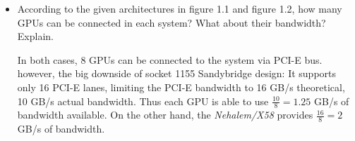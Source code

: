 \documentclass[12pt]{article}
\numberwithin{equation}{section}
\numberwithin{table}{section}
\numberwithin{figure}{section}
\begin{document}
\begin{itemize}
	\item According to the given architectures in figure 1.1 and figure 1.2, how many GPUs can be connected in each system? What about their bandwidth? Explain.
	
	In both cases, 8 GPUs can be connected to the system via PCI-E bus. however, the big downside of socket 1155 Sandybridge design: It supports only 16 PCI-E
	lanes, limiting the PCI-E bandwidth to 16 GB/s theoretical, 10 GB/s actual bandwidth. Thus each GPU is able to use $\frac{10}{8} = 1.25$ GB/s of bandwidth available. On the other hand, the \textit{Nehalem/X58} provides $\frac{16}{8} = 2$ GB/s of bandwidth.
\end{itemize}
\end{document}
